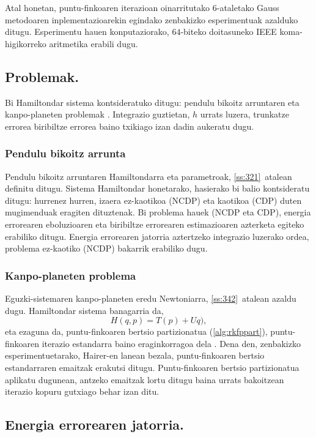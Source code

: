 Atal honetan, puntu-finkoaren iterazioan oinarritutako $6$-ataletako Gauss metodoaren inplementazioarekin egindako zenbakizko esperimentuak azalduko ditugu. Esperimentu hauen konputaziorako, $64$-biteko doitasuneko IEEE koma-higikorreko aritmetika erabili dugu.

\subsection{Problemak.}

Bi Hamiltondar sistema kontsideratuko ditugu: pendulu bikoitz arruntaren eta kanpo-planeten problemak \cite{Hairer2006} \cite{Dumitru}. Integrazio guztietan, $h$ urrats luzera, trunkatze errorea biribiltze errorea baino txikiago izan dadin aukeratu dugu.

\subsubsection*{Pendulu bikoitz arrunta}
Pendulu bikoitz arruntaren Hamiltondarra eta parametroak, \ref{ss:321}~atalean definitu ditugu. Sistema Hamiltondar honetarako, hasierako bi balio kontsideratu ditugu: hurrenez hurren, izaera ez-kaotikoa (NCDP) eta kaotikoa (CDP) duten mugimenduak eragiten dituztenak. Bi problema hauek (NCDP eta CDP), energia errorearen eboluzioaren eta biribiltze errorearen estimazioaren azterketa egiteko erabiliko ditugu. Energia errorearen jatorria aztertzeko integrazio luzerako ordea, problema ez-kaotiko (NCDP) bakarrik erabiliko dugu.       

\subsubsection*{Kanpo-planeten problema}
Eguzki-sistemaren kanpo-planeten eredu Newtoniarra, \ref{ss:342}~atalean azaldu dugu. Hamiltondar sistema banagarria da,
\begin{equation*}
H(q,p)= T(p)+Uq),
\end{equation*}
eta ezaguna da, puntu-finkoaren bertsio partizionatua (\ref{alg:rkfppart}), puntu-finkoaren iterazio estandarra baino eraginkorragoa dela  \cite{Sanz-Serna1992}. Dena den, zenbakizko esperimentuetarako, Hairer-en \cite{Hairer2008} lanean bezala, puntu-finkoaren bertsio estandarraren emaitzak erakutsi ditugu. Puntu-finkoaren bertsio partizionatua aplikatu dugunean, antzeko emaitzak lortu ditugu baina urrats bakoitzean iterazio kopuru gutxiago behar izan ditu.  


\subsection{Energia errorearen jatorria.}


